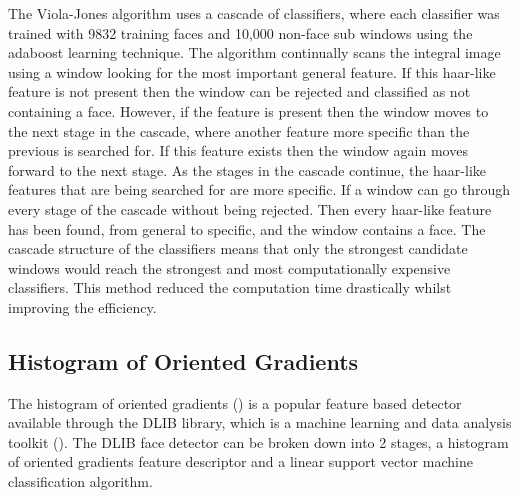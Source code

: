 \documentclass{l4proj}
\begin{document}
The Viola-Jones algorithm uses a cascade of classifiers, where each classifier was trained with 9832 training faces and 10,000 non-face sub windows using the adaboost learning technique. The algorithm continually scans the integral image using a window looking for the most important general feature. If this haar-like feature is not present then the window can be rejected and classified as not containing a face. However, if the feature is present then the window moves to the next stage in the cascade, where another feature more specific than the previous is searched for. If this feature exists then the window again moves forward to the next stage. As the stages in the cascade continue, the haar-like features that are being searched for are more specific. If a window can go through every stage of the cascade without being rejected. Then every haar-like feature has been found, from general to specific, and the window contains a face. The cascade structure of the classifiers means that only the strongest candidate windows would reach the strongest and most computationally expensive classifiers. This method reduced the computation time drastically whilst improving the efficiency. 


\subsection{Histogram of Oriented Gradients}
\label{hog}
The histogram of oriented gradients (\cite{hog}) is a popular feature based detector available through the DLIB library, which is a machine learning and data analysis toolkit (\cite{dlib}). The DLIB face detector can be broken down into 2 stages, a histogram of oriented gradients feature descriptor and a linear support vector machine classification algorithm. 
\end{document}
